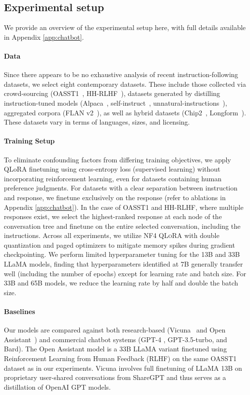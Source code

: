 \subsection{Experimental setup} We provide an overview of the experimental setup here, with full details available in Appendix \ref{app:chatbot}.

\paragraph{Data} Since there appears to be no exhaustive analysis of recent instruction-following datasets, we select eight contemporary datasets. These include those collected via crowd-sourcing (OASST1~\citep{kopf2023openassistant}, HH-RLHF~\citep{bai2022training}), datasets generated by distilling instruction-tuned models (Alpaca~\citep{alpaca}, self-instruct~\citep{wang2022self}, unnatural-instructions~\citep{honovich2022unnatural}), aggregated corpora (FLAN v2~\citep{chung2022scaling}), as well as hybrid datasets (Chip2~\citep{laion2023}, Longform~\citep{koksal2023longform}). These datasets vary in terms of languages, sizes, and licensing.

\paragraph{Training Setup} To eliminate confounding factors from differing training objectives, we apply QLoRA finetuning using cross-entropy loss (supervised learning) without incorporating reinforcement learning, even for datasets containing human preference judgments. For datasets with a clear separation between instruction and response, we finetune exclusively on the response (refer to ablations in Appendix \ref{app:chatbot}). In the case of OASST1 and HH-RLHF, where multiple responses exist, we select the highest-ranked response at each node of the conversation tree and finetune on the entire selected conversation, including the instructions. Across all experiments, we utilize NF4 \textsc{QLoRA} with double quantization and paged optimizers to mitigate memory spikes during gradient checkpointing. We perform limited hyperparameter tuning for the 13B and 33B LLaMA models, finding that hyperparameters identified at 7B generally transfer well (including the number of epochs) except for learning rate and batch size. For 33B and 65B models, we reduce the learning rate by half and double the batch size.

\paragraph{Baselines} Our models are compared against both research-based (Vicuna~\citep{vicuna2023} and Open Assistant~\citep{kopf2023openassistant}) and commercial chatbot systems (GPT-4 \citep{openai2023gpt}, GPT-3.5-turbo, and Bard). The Open Assistant model is a 33B LLaMA variant finetuned using Reinforcement Learning from Human Feedback (RLHF) on the same OASST1 dataset as in our experiments. Vicuna involves full finetuning of LLaMA 13B on proprietary user-shared conversations from ShareGPT and thus serves as a distillation of OpenAI GPT models.

